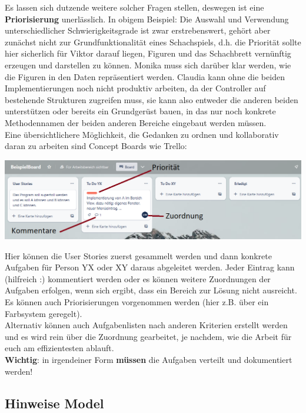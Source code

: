 \documentclass{article}
\begin{document}
Es lassen sich dutzende weitere solcher Fragen stellen, deswegen ist eine \textbf{Priorisierung} unerlässlich. In obigem Beispiel: Die Auswahl und Verwendung unterschiedlicher Schwierigkeitsgrade ist zwar erstrebenswert, gehört aber zunächst nicht zur Grundfunktionalität eines Schachspiels, d.h. die Priorität sollte hier sicherlich für Viktor darauf liegen, Figuren und das Schachbrett vernünftig erzeugen und darstellen zu können. Monika muss sich darüber klar werden, wie die Figuren in den Daten repräsentiert werden. Claudia kann ohne die beiden Implementierungen noch nicht produktiv arbeiten, da der Controller auf bestehende Strukturen zugreifen muss, sie kann also entweder die anderen beiden unterstützen oder bereits ein Grundgerüst bauen, in das nur noch konkrete Methodennamen der beiden anderen Bereiche eingebaut werden müssen. \\
Eine übersichtlichere Möglichkeit, die Gedanken zu ordnen und kollaborativ daran zu arbeiten sind Concept Boards wie Trello:
\begin{center}
    \includegraphics[scale=0.5]{../../media/trello.png}
\end{center}
Hier können die User Stories zuerst gesammelt werden und dann konkrete Aufgaben für Person YX oder XY daraus abgeleitet werden. Jeder Eintrag kann (hilfreich :) kommentiert werden oder es können weitere Zuordnungen der Aufgaben erfolgen, wenn sich ergibt, dass ein Bereich zur Lösung nicht ausreicht. Es können auch Priorisierungen vorgenommen werden (hier z.B. über ein Farbsystem geregelt). \\
Alternativ können auch Aufgabenlisten nach anderen Kriterien erstellt werden und es wird rein über die Zuordnung gearbeitet, je nachdem, wie die Arbeit für euch am effizientesten ablauft. \\
\textbf{Wichtig}: in irgendeiner Form \textbf{müssen} die Aufgaben verteilt und dokumentiert werden!

\subsection{Hinweise Model}
\label{sec:hwModel}
\end{document}
